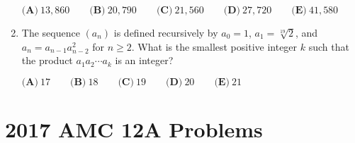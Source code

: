 \documentclass{article}
\begin{document}
\begin{enumerate}[label=\arabic*., itemsep=0.5em]
\(\textbf{(A)}\ 13,860\qquad\textbf{(B)}\ 20,790\qquad\textbf{(C)}\ 21,560 \qquad\textbf{(D)}\ 27,720 \qquad\textbf{(E)}\ 41,580\)\par \vspace{0.5em}\item The sequence \((a_n)\) is defined recursively by \(a_0=1\), \(a_1=\sqrt[19]{2}\), and \(a_n=a_{n-1}a_{n-2}^2\) for \(n\geq 2\). What is the smallest positive integer \(k\) such that the product \(a_1a_2\cdots a_k\) is an integer?

\(\textbf{(A)}\ 17\qquad\textbf{(B)}\ 18\qquad\textbf{(C)}\ 19\qquad\textbf{(D)}\ 20\qquad\textbf{(E)}\ 21\)\par \vspace{0.5em}
\end{enumerate}
\newpage\section*{2017 AMC 12A Problems}
\end{document}
